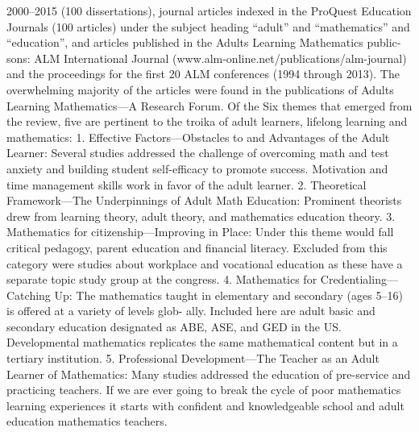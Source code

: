 \documentclass{article}
\begin{document}
 2000–2015 (100 dissertations), journal articles indexed in the ProQuest Education
 Journals (100 articles) under the subject heading “adult” and “mathematics” and
 “education”, and articles published in the Adults Learning Mathematics public-
   sons: ALM International Journal (www.alm-online.net/publications/alm-journal)
 and the proceedings for the first 20 ALM conferences (1994 through 2013). The
 overwhelming majority of the articles were found in the publications of Adults
 Learning Mathematics—A Research Forum. Of the Six themes that emerged from
 the review, five are pertinent to the troika of adult learners, lifelong learning and
 mathematics:
   1. Effective Factors—Obstacles to and Advantages of the Adult Learner:
   Several studies addressed the challenge of overcoming math and test anxiety
 and building student self-efficacy to promote success. Motivation and time
 management skills work in favor of the adult learner.
 2. Theoretical Framework—The Underpinnings of Adult Math Education:
   Prominent theorists drew from learning theory, adult theory, and mathematics
 education theory.
 3. Mathematics for citizenship—Improving in Place: Under this theme would
 fall critical pedagogy, parent education and financial literacy. Excluded from
 this category were studies about workplace and vocational education as these
 have a separate topic study group at the congress.
 4. Mathematics for Credentialing—Catching Up: The mathematics taught in
 elementary and secondary (ages 5–16) is offered at a variety of levels glob-
   ally. Included here are adult basic and secondary education designated as ABE,
 ASE, and GED in the US. Developmental mathematics replicates the same
 mathematical content but in a tertiary institution.
 5. Professional Development—The Teacher as an Adult Learner of Mathematics:
   Many studies addressed the education of pre-service and practicing teachers. If
 we are ever going to break the cycle of poor mathematics learning experiences it
 starts with confident and knowledgeable school and adult education mathematics
 teachers.
\textit{\\\\}
\end{document}
